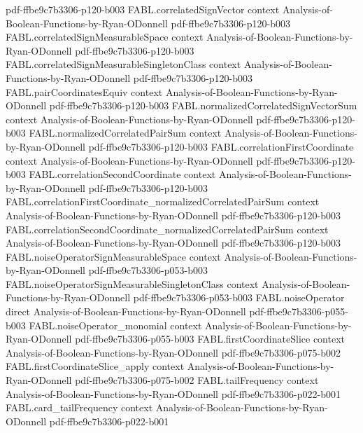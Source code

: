 \begin{theorem}
  {pdf-ffbe9c7b3306-p120-b003}
\proofstep
  {FABL.correlatedSignVector}
  {context}
  {Analysis-of-Boolean-Functions-by-Ryan-ODonnell}
  {pdf-ffbe9c7b3306-p120-b003}
\proofstep
  {FABL.correlatedSignMeasurableSpace}
  {context}
  {Analysis-of-Boolean-Functions-by-Ryan-ODonnell}
  {pdf-ffbe9c7b3306-p120-b003}
\proofstep
  {FABL.correlatedSignMeasurableSingletonClass}
  {context}
  {Analysis-of-Boolean-Functions-by-Ryan-ODonnell}
  {pdf-ffbe9c7b3306-p120-b003}
\proofstep
  {FABL.pairCoordinatesEquiv}
  {context}
  {Analysis-of-Boolean-Functions-by-Ryan-ODonnell}
  {pdf-ffbe9c7b3306-p120-b003}
\proofstep
  {FABL.normalizedCorrelatedSignVectorSum}
  {context}
  {Analysis-of-Boolean-Functions-by-Ryan-ODonnell}
  {pdf-ffbe9c7b3306-p120-b003}
\proofstep
  {FABL.normalizedCorrelatedPairSum}
  {context}
  {Analysis-of-Boolean-Functions-by-Ryan-ODonnell}
  {pdf-ffbe9c7b3306-p120-b003}
\proofstep
  {FABL.correlationFirstCoordinate}
  {context}
  {Analysis-of-Boolean-Functions-by-Ryan-ODonnell}
  {pdf-ffbe9c7b3306-p120-b003}
\proofstep
  {FABL.correlationSecondCoordinate}
  {context}
  {Analysis-of-Boolean-Functions-by-Ryan-ODonnell}
  {pdf-ffbe9c7b3306-p120-b003}
\proofstep
  {FABL.correlationFirstCoordinate_normalizedCorrelatedPairSum}
  {context}
  {Analysis-of-Boolean-Functions-by-Ryan-ODonnell}
  {pdf-ffbe9c7b3306-p120-b003}
\proofstep
  {FABL.correlationSecondCoordinate_normalizedCorrelatedPairSum}
  {context}
  {Analysis-of-Boolean-Functions-by-Ryan-ODonnell}
  {pdf-ffbe9c7b3306-p120-b003}
\proofstep
  {FABL.noiseOperatorSignMeasurableSpace}
  {context}
  {Analysis-of-Boolean-Functions-by-Ryan-ODonnell}
  {pdf-ffbe9c7b3306-p053-b003}
\proofstep
  {FABL.noiseOperatorSignMeasurableSingletonClass}
  {context}
  {Analysis-of-Boolean-Functions-by-Ryan-ODonnell}
  {pdf-ffbe9c7b3306-p053-b003}
\proofstep
  {FABL.noiseOperator}
  {direct}
  {Analysis-of-Boolean-Functions-by-Ryan-ODonnell}
  {pdf-ffbe9c7b3306-p055-b003}
\proofstep
  {FABL.noiseOperator_monomial}
  {context}
  {Analysis-of-Boolean-Functions-by-Ryan-ODonnell}
  {pdf-ffbe9c7b3306-p055-b003}
\proofstep
  {FABL.firstCoordinateSlice}
  {context}
  {Analysis-of-Boolean-Functions-by-Ryan-ODonnell}
  {pdf-ffbe9c7b3306-p075-b002}
\proofstep
  {FABL.firstCoordinateSlice_apply}
  {context}
  {Analysis-of-Boolean-Functions-by-Ryan-ODonnell}
  {pdf-ffbe9c7b3306-p075-b002}
\proofstep
  {FABL.tailFrequency}
  {context}
  {Analysis-of-Boolean-Functions-by-Ryan-ODonnell}
  {pdf-ffbe9c7b3306-p022-b001}
\proofstep
  {FABL.card_tailFrequency}
  {context}
  {Analysis-of-Boolean-Functions-by-Ryan-ODonnell}
  {pdf-ffbe9c7b3306-p022-b001}

\end{theorem}
